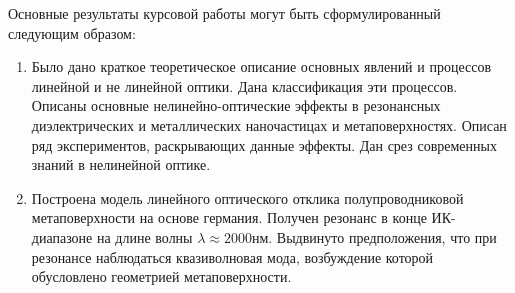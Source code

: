 

Основные результаты курсовой работы могут быть сформулированный следующим образом:
\begin{enumerate}
\item Было дано краткое теоретическое описание основных явлений и процессов линейной и не линейной оптики. Дана классификация эти процессов. Описаны основные нелинейно-оптические эффекты в резонансных диэлектрических и металлических наночастицах и метаповерхностях. Описан ряд экспериментов, раскрывающих данные эффекты.  Дан срез современных знаний в нелинейной оптике. 
\item Построена модель линейного оптического отклика полупроводниковой метаповерхности на основе германия.  Получен резонанс  в  конце ИК-диапазоне на длине волны $ \lambda \approx  2000$нм. Выдвинуто предположения,  что при резонансе наблюдаться квазиволновая мода, возбуждение которой обусловлено геометрией метаповерхности.  
\end{enumerate}
